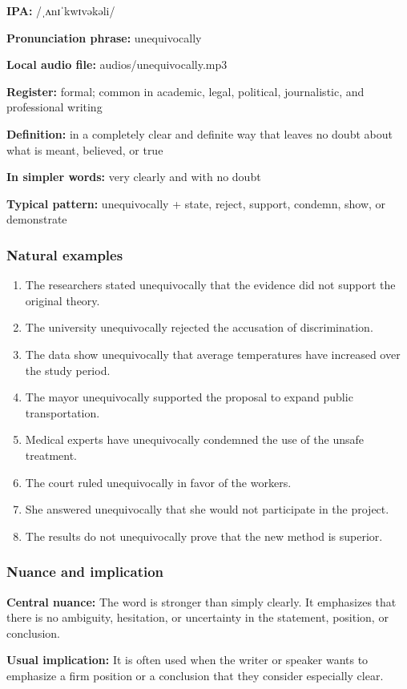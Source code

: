\documentclass[11pt]{article}
\begin{document}
\textbf{IPA:} /ˌʌnɪˈkwɪvəkəli/

\textbf{Pronunciation phrase:} unequivocally

\textbf{Local audio file:} audios/unequivocally.mp3

\textbf{Register:} formal; common in academic, legal, political, journalistic, and professional writing

\textbf{Definition:} in a completely clear and definite way that leaves no doubt about what is meant, believed, or true

\textbf{In simpler words:} very clearly and with no doubt

\textbf{Typical pattern:} unequivocally + state, reject, support, condemn, show, or demonstrate

\subsubsection{Natural examples}
\begin{enumerate}
  \item The researchers stated unequivocally that the evidence did not support the original theory.
  \item The university unequivocally rejected the accusation of discrimination.
  \item The data show unequivocally that average temperatures have increased over the study period.
  \item The mayor unequivocally supported the proposal to expand public transportation.
  \item Medical experts have unequivocally condemned the use of the unsafe treatment.
  \item The court ruled unequivocally in favor of the workers.
  \item She answered unequivocally that she would not participate in the project.
  \item The results do not unequivocally prove that the new method is superior.
\end{enumerate}

\subsubsection{Nuance and implication}
\textbf{Central nuance:} The word is stronger than simply clearly. It emphasizes that there is no ambiguity, hesitation, or uncertainty in the statement, position, or conclusion.

\textbf{Usual implication:} It is often used when the writer or speaker wants to emphasize a firm position or a conclusion that they consider especially clear.
\end{document}
